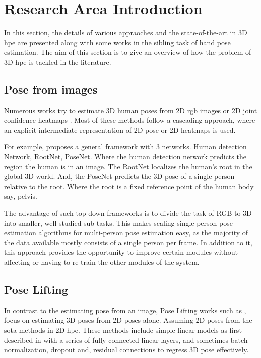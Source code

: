 
\section{Research Area Introduction}
\label{sec:Research area introduction}

In this section, the details of various appraoches and the state-of-the-art in 3D \ac{hpe} are presented along with some works in the sibling task of hand pose estimation. The aim of this section is to give an overview of how the problem of 3D \ac{hpe} is tackled in the literature.

\subsection{Pose from images}

Numerous works try to estimate 3D human poses from 2D \ac{rgb} images or 2D joint confidence heatmaps \cite{CameraDistanceAware, poselifter, DistillNRSfM, occlusionVideo}. Most of these methods follow a cascading approach, where an explicit intermediate representation of 2D pose or 2D heatmaps is used.

For example, \cite{CameraDistanceAware} proposes a general framework with 3 networks. Human detection Network, RootNet, PoseNet. Where the human
detection network predicts the region the human is in an image. The RootNet localizes the human's root in the global 3D world. And, the PoseNet
predicts the 3D pose of a single person relative to the root. Where the root is a fixed reference point of the human body say, pelvis.

The advantage of such top-down frameworks is to divide the task of RGB to 3D into smaller, well-studied sub-tasks. This makes scaling single-person
pose estimation algorithms for multi-person pose estimation easy, as the majority of the data available mostly consists of a single person per
frame. In addition to it, this approach provides the opportunity to improve certain modules without affecting or having to re-train the other modules
of the system.

\subsection{Pose Lifting}

In contrast to the estimating pose from an image, Pose Lifting works such
as \cite{poselifter,  amazon1, repnet, c3dpo, unsupervisedAdversarial},
focus on estimating 3D poses from 2D poses alone. Assuming 2D poses from
the \ac{sota} methods in 2D \ac{hpe}. These methods include simple linear
models as first described in \cite{MartinezHRL17} with a series of fully
connected linear layers, and sometimes batch normalization, dropout and,
residual connections to regress 3D pose effectively.

